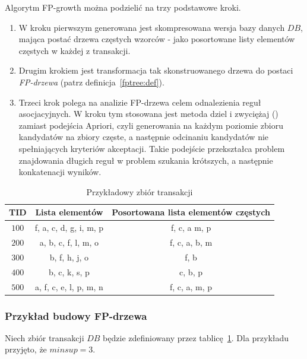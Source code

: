 Algorytm FP-growth można podzielić na trzy podstawowe kroki.
\begin{enumerate}
	\item W kroku pierwszym generowana jest skompresowana wersja bazy danych $DB$, mająca postać drzewa częstych wzorców - jako posortowane listy elementów częstych w każdej z transakcji.
	\item Drugim krokiem jest transformacja tak skonstruowanego drzewa do postaci \emph{FP-drzewa} (patrz definicja~\ref{fptree:def}).
	\item Trzeci krok polega na analizie FP-drzewa celem odnalezienia reguł asocjacyjnych. W kroku tym stosowana jest metoda dziel i zwyciężaj () zamiast podejścia Apriori, czyli generowania na każdym poziomie zbioru kandydatów na zbiory częste, a następnie odcinaniu kandydatów nie spełniających kryteriów akceptacji. Takie podejście przekształca problem znajdowania długich reguł w problem szukania krótszych, a następnie konkatenacji wyników. 
\end{enumerate}

\begin{table}
	\centering
	\begin{tabular}{c|c|c}
	\textbf{TID} &  \textbf{Lista elementów} & \textbf{Posortowana lista elementów częstych} \\ \hline
	$100$ & f, a, c, d, g, i, m, p & f, c, a m, p \\ 
	$200$ & a, b, c, f, l, m, o & f, c, a, b, m \\ 
	$300$ & b, f, h, j, o & f, b \\
	$400$ & b, c, k, s, p & c, b, p \\
	$500$ & a, f, c, e, l, p, m, n & f, c, a, m, p \\ 
	\end{tabular}
	\caption{Przykładowy zbiór transakcji\label{example:fp_data}}
\end{table}

\subsubsection{Przykład budowy FP-drzewa}\label{sec:example_fptree}
Niech zbiór transakcji $DB$ będzie zdefiniowany przez tablicę~\ref{example:fp_data}. Dla przykładu przyjęto, że $minsup = 3$.

